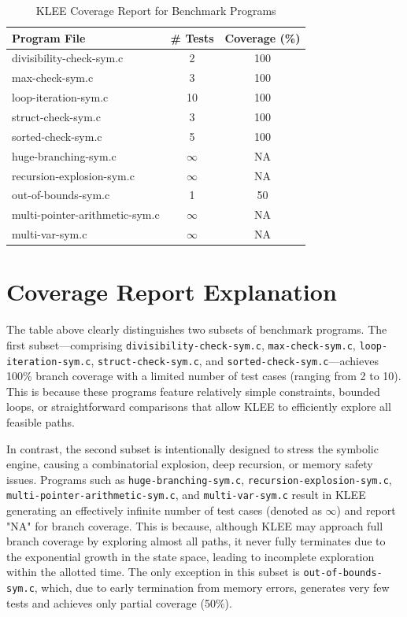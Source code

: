\documentclass[conference]{IEEEtran}
\begin{document}
\begin{table}[ht]
\centering
\caption{KLEE Coverage Report for Benchmark Programs}
\begin{tabular}{|l|c|c|}
\hline
\textbf{Program File} & \textbf{\# Tests} & \textbf{Coverage (\%)} \\
\hline
divisibility-check-sym.c       &  2 & 100  \\
max-check-sym.c                &  3 & 100  \\
loop-iteration-sym.c           &  10 & 100  \\
struct-check-sym.c             &  3 & 100  \\
sorted-check-sym.c             &  5 & 100  \\
huge-branching-sym.c           &  $\infty$ & NA  \\
recursion-explosion-sym.c      &  $\infty$ & NA  \\
out-of-bounds-sym.c            &  1& 50  \\
multi-pointer-arithmetic-sym.c &  $\infty$& NA  \\
multi-var-sym.c                &  $\infty$& NA  \\
\hline
\end{tabular}
\label{tab:coverage-report}
\end{table}

\section{Coverage Report Explanation}
The table above clearly distinguishes two subsets of benchmark programs. The first subset—comprising \texttt{divisibility-check-sym.c}, \texttt{max-check-sym.c}, \texttt{loop-iteration-sym.c}, \texttt{struct-check-sym.c}, and \texttt{sorted-check-sym.c}—achieves 100\% branch coverage with a limited number of test cases (ranging from 2 to 10). This is because these programs feature relatively simple constraints, bounded loops, or straightforward comparisons that allow KLEE to efficiently explore all feasible paths.

In contrast, the second subset is intentionally designed to stress the symbolic engine, causing a combinatorial explosion, deep recursion, or memory safety issues. Programs such as \texttt{huge-branching-sym.c}, \texttt{recursion-explosion-sym.c}, \texttt{multi-pointer-arithmetic-sym.c}, and \texttt{multi-var-sym.c} result in KLEE generating an effectively infinite number of test cases (denoted as $\infty$) and report "NA" for branch coverage. This is because, although KLEE may approach full branch coverage by exploring almost all paths, it never fully terminates due to the exponential growth in the state space, leading to incomplete exploration within the allotted time. The only exception in this subset is \texttt{out-of-bounds-sym.c}, which, due to early termination from memory errors, generates very few tests and achieves only partial coverage (50\%).
\end{document}

